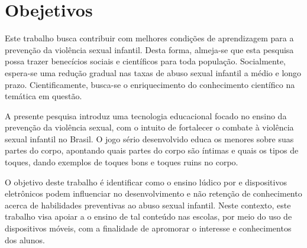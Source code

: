





\section{Obejetivos}\label{sec:objetivos}

Este trabalho busca contribuir com melhores condições de aprendizagem para a prevenção da violência sexual infantil. Desta forma, almeja-se que esta pesquisa possa trazer benecícios sociais e científicos para toda população. Socialmente, espera-se uma redução gradual nas taxas de abuso sexual infantil a médio e longo prazo. Cientificamente, busca-se o enriquecimento do conhecimento científico na temática em questão. 

A presente pesquisa introduz uma tecnologia educacional focado no ensino da prevenção da violência sexual, com o intuito de fortalecer o combate à violência sexual infantil no Brasil. O jogo sério desenvolvido educa os menores sobre suas partes do corpo, apontando quais partes do corpo são íntimas e quais os tipos de toques, dando exemplos de toques bons e toques ruins no corpo. 


O objetivo deste trabalho é identificar como o ensino lúdico por e dispositivos eletrônicos podem influenciar no desenvolvimento e não retenção de conhecimento acerca de habilidades preventivas ao abuso sexual infantil. Neste contexto, este trabalho visa apoiar a o ensino de tal conteúdo nas escolas, por meio do uso de dispositivos móveis, com a finalidade de apromorar o interesse e conhecimentos dos alunos.

